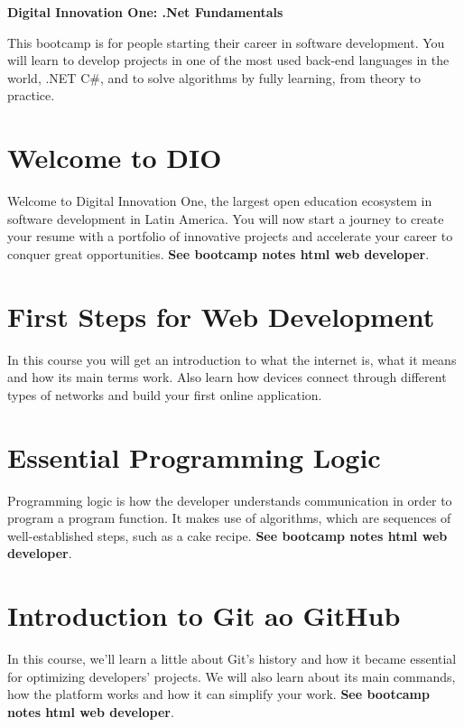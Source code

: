 \documentclass[12pt,executivepaper]{article}
\begin{document}
	\textbf{ \centering \Huge Digital Innovation One: .Net Fundamentals} %
	
	This bootcamp is for people starting their career in software development. You will learn to develop projects in one of the most used back-end languages in the world, .NET C\#, and to solve algorithms by fully learning, from theory to practice.
	
	\section{Welcome to DIO} 
	
	Welcome to Digital Innovation One, the largest open education ecosystem in software development in Latin America. You will now start a journey to create your resume with a portfolio of innovative projects and accelerate your career to conquer great opportunities. \textbf{See bootcamp notes html web developer}.
	
	\section{First Steps for Web Development}
	
	In this course you will get an introduction to what the internet is, what it means and how its main terms work. Also learn how devices connect through different types of networks and build your first online application.
	
	\section{Essential Programming Logic}
	
	Programming logic is how the developer understands communication in order to program a program function. It makes use of algorithms, which are sequences of well-established steps, such as a cake recipe. \textbf{See bootcamp notes html web developer}.
	
	\section{Introduction to  Git ao GitHub}
	
	In this course, we'll learn a little about Git's history and how it became essential for optimizing developers' projects. We will also learn about its main commands, how the platform works and how it can simplify your work. \textbf{See bootcamp notes html web developer}.
	
\end{document}
